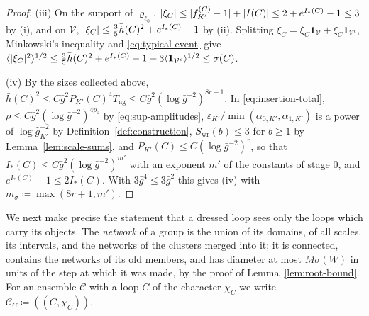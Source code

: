 \documentclass[11pt]{preprint}
\DeclarePairedDelimiter{\abs}{\lvert}{\rvert}
\numberwithin{equation}{section}
\theoremstyle{definition}
\theoremstyle{remark}
\theoremstyle{plain}
\begin{document}
\begin{proof}
(iii) On the support of $\varrho_{\ell_0}$, $\abs{\xi_C} \leq \abs{f^{(C)}_{K'} - 1} + \abs{I(C)} \leq 2 + e^{I_*(C)} - 1 \leq 3$ by (i), and on $\mathcal V$, $\abs{\xi_C} \leq \frac35\bar h(C)^2 + e^{I_*(C)} - 1$ by (ii). Splitting $\xi_C = \xi_C\mathbf 1_{\mathcal V} + \xi_C\mathbf 1_{\mathcal V^c}$, Minkowski's inequality and \eqref{eq:typical-event} give $\langle\abs{\xi_C}^2\rangle^{1/2} \leq \frac35\bar h(C)^2 + e^{I_*(C)} - 1 + 3\langle\mathbf 1_{\mathcal V^c}\rangle^{1/2} \leq \sigma(C)$.

(iv) By the sizes collected above, $\bar h(C)^2 \leq C\bar g^2P_{K'}(C)^4T_{\mathrm{ng}} \leq C\bar g^2(\log\bar g^{-2})^{8r+1}$. In \eqref{eq:insertion-total}, $\bar\rho \leq C\bar g^2(\log\bar g^{-2})^{4p_0}$ by \eqref{eq:sup-amplitudes}, $\varepsilon_{K'}/\min(\alpha_{0,K'}, \alpha_{1,K'})$ is a power of $\log\hat g_{K'}^{-2}$ by Definition~\ref{def:construction}, $S_{\mathrm{wr}}(b) \leq 3$ for $b \geq 1$ by Lemma~\ref{lem:scale-sums}, and $P_{K'}(C) \leq C(\log\bar g^{-2})^r$, so that $I_*(C) \leq C\bar g^2(\log\bar g^{-2})^{m'}$ with an exponent $m'$ of the constants of stage $0$, and $e^{I_*(C)} - 1 \leq 2I_*(C)$. With $3\bar g^4 \leq 3\bar g^2$ this gives (iv) with $m_\sigma \coloneqq \max(8r + 1, m')$.
\end{proof}

We next make precise the statement that a dressed loop sees only the loops which carry its objects. The \emph{network} of a group is the union of its domains, of all scales, its intervals, and the networks of the clusters merged into it; it is connected, contains the networks of its old members, and has diameter at most $M\sigma(W)$ in units of the step at which it was made, by the proof of Lemma~\ref{lem:root-bound}. For an ensemble $\mathcal C$ with a loop $C$ of the character $\chi_C$ we write $\mathcal C_C \coloneqq ((C, \chi_C))$.
\end{document}
